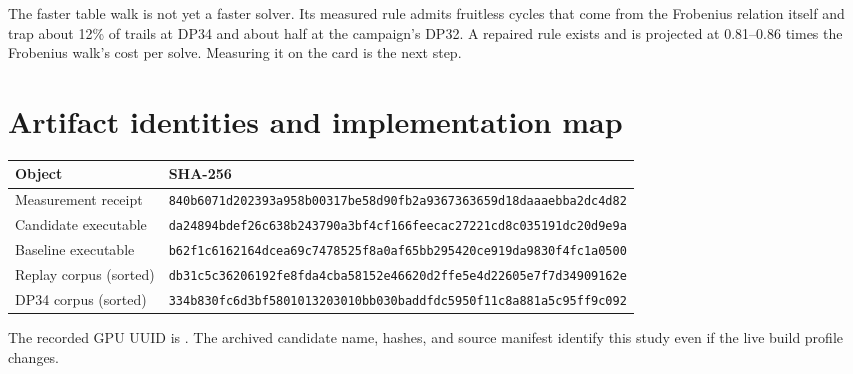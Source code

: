\documentclass[11pt,a4paper]{article}
\newcommand{\hashval}[2]{\texttt{\footnotesize #1}\newline\texttt{\footnotesize #2}}
\begin{document}
The faster table walk is not yet a faster solver. Its measured rule admits fruitless cycles that come from the Frobenius relation itself and trap about 12\% of trails at DP34 and about half at the campaign's DP32. A repaired rule exists and is projected at 0.81--0.86 times the Frobenius walk's cost per solve. Measuring it on the card is the next step.




\clearpage
\appendix
\section{Artifact identities and implementation map}
\small
\begin{tabularx}{\linewidth}{@{}lY@{}}
\toprule
Object & SHA-256\\
\midrule
Measurement receipt & \hashval{840b6071d202393a958b00317be58d90f}{b2a9367363659d18daaaebba2dc4d82}\\
Candidate executable & \hashval{da24894bdef26c638b243790a3bf4cf1}{66feecac27221cd8c035191dc20d9e9a}\\
Baseline executable & \hashval{b62f1c6162164dcea69c7478525f8a0a}{f65bb295420ce919da9830f4fc1a0500}\\
Replay corpus (sorted) & \hashval{db31c5c36206192fe8fda4cba58152e4}{6620d2ffe5e4d22605e7f7d34909162e}\\
DP34 corpus (sorted) & \hashval{334b830fc6d3bf5801013203010bb030}{baddfdc5950f11c8a881a5c95ff9c092}\\
\bottomrule
\end{tabularx}
\normalsize
\medskip
The recorded GPU UUID is . The archived candidate name, hashes, and source manifest identify this study even if the live build profile changes.
\end{document}
